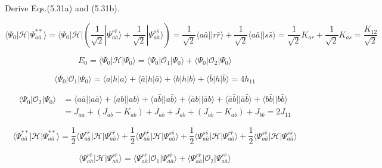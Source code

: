 \documentclass[a4paper]{book}
\begin{document}
	\begin{exercise}
	Derive Eqs.(5.31a) and (5.31b).
	\end{exercise}
	
	\begin{solution}
	
	\[
		\langle \Psi_0 | \mathscr{H} | \Psi^{**}_{a \bar{a}} \rangle = \langle \Psi_0 | \mathscr{H} | \left( \frac{1}{ \sqrt{2} } | \Psi^{ r \bar{r} }_{ a \bar{a} } \rangle + \frac{1}{ \sqrt{2} } | \Psi^{ s \bar{s} }_{ a \bar{a} } \rangle \right) = \frac{1}{ \sqrt{2} } \langle a \bar{a} || r \bar{r} \rangle + \frac{1}{ \sqrt{2} } \langle a \bar{a} || s \bar{s} \rangle = \frac{1}{ \sqrt{2} } K_{ar} + \frac{1}{ \sqrt{2} } K_{as} = \frac{ K_{12} }{ \sqrt{2} }
	\]
	
	\[
		E_0 = \langle \Psi_0 | \mathscr{H} | \Psi_0 \rangle = \langle \Psi_0 | \mathscr{O}_1 | \Psi_0 \rangle + \langle \Psi_0 | \mathscr{O}_2 | \Psi_0 \rangle
	\]
	
	\[
		\langle \Psi_0 | \mathscr{O}_1 | \Psi_0 \rangle = \langle a | h | a \rangle + \langle \bar{a} | h | \bar{a} \rangle + \langle b | h | b \rangle + \langle \bar{b} | h | \bar{b} \rangle = 4 h_{11}
	\]
	
	\begin{align*}
		\langle \Psi_0 | \mathscr{O}_2 | \Psi_0 \rangle &= \langle a \bar{a} || a \bar{a} \rangle + \langle ab || ab \rangle + \langle a \bar{b} || a \bar{b} \rangle + \langle \bar{a} b || \bar{a} b \rangle + \langle \bar{a} \bar{b} || \bar{a} \bar{b} \rangle + \langle b \bar{b} || b \bar{b} \rangle \\
		&= J_{aa} + \left( J_{ab} - K_{ab} \right) + J_{ab} + J_{ab} + \left( J_{ab} - K_{ab} \right) + J_{bb} = 2 J_{11}
	\end{align*}
	
	\[
		\langle \Psi^{**}_{a \bar{a}} | \mathscr{H} | \Psi^{**}_{a \bar{a}} \rangle = \frac{1}{2} \langle \Psi^{r \bar{r}}_{a \bar{a}} | \mathscr{H} | \Psi^{r \bar{r}}_{a \bar{a}} \rangle + \frac{1}{2} \langle \Psi^{r \bar{r}}_{a \bar{a}} | \mathscr{H} | \Psi^{s \bar{s}}_{a \bar{a}} \rangle + \frac{1}{2} \langle \Psi^{s \bar{s}}_{a \bar{a}} | \mathscr{H} | \Psi^{r \bar{r}}_{a \bar{a}} \rangle + \frac{1}{2} \langle \Psi^{s \bar{s}}_{a \bar{a}} | \mathscr{H} | \Psi^{s \bar{s}}_{a \bar{a}} \rangle 
	\]
	
	\[
		\langle \Psi^{r \bar{r}}_{a \bar{a}} | \mathscr{H} | \Psi^{r \bar{r}}_{a \bar{a}} \rangle = \langle \Psi^{r \bar{r}}_{a \bar{a}} | \mathscr{O}_1 | \Psi^{r \bar{r}}_{a \bar{a}} \rangle + \langle \Psi^{r \bar{r}}_{a \bar{a}} | \mathscr{O}_2 | \Psi^{r \bar{r}}_{a \bar{a}} \rangle
	\]
	

\end{solution}
\end{document}

